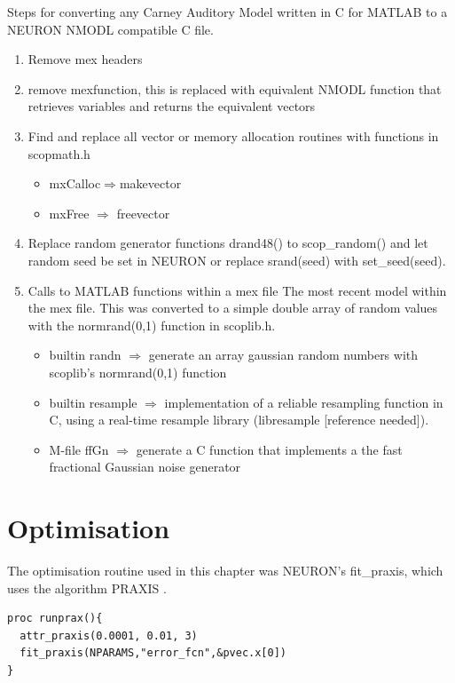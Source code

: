 Steps for converting any Carney Auditory Model written in C for MATLAB to a
NEURON NMODL compatible C file.
\begin{enumerate} 
\item Remove mex headers 
\item remove \textsf{mexfunction}, this is replaced with equivalent NMODL
  function that retrieves variables and returns the equivalent vectors
\item Find and replace all vector or memory allocation routines with functions
  in scopmath.h
\begin{itemize} 
\item \textsf{mxCalloc}$\Rightarrow$\textsf{makevector}
\item \textsf{mxFree} $\Rightarrow$ \textsf{freevector}
\end{itemize} 
\item Replace random generator functions \textsf{drand48()} to
  \mbox{\textsf{scop\_random()}} and let random seed be set in NEURON or replace
  \textsf{srand(seed)} with \mbox{\textsf{set\_seed(seed)}}.
\item Calls to MATLAB functions within a mex file The most recent model within
  the mex file.  This was converted to a simple double array of random values
  with the \mbox{\textsf{normrand(0,1)}} function in \mbox{\textsf{scoplib.h}}.
\begin{itemize}
\item builtin \textsf{randn} $\Rightarrow$ generate an array gaussian random numbers with scoplib's
  \mbox{\textsf{normrand(0,1)}} function
\item builtin \textsf{resample} $\Rightarrow$ implementation of a reliable resampling function in C, using
  a real-time resample library (libresample [reference needed]).
\item M-file \textsf{ffGn} $\Rightarrow$ generate a C function that implements a the fast fractional Gaussian noise generator
\end{itemize}

\end{enumerate}


\section{Optimisation}

The optimisation  routine used in this chapter was NEURON's \textsf{fit\_praxis}, which uses the algorithm PRAXIS \citep{Brent:1976}.

\begin{lstlisting}[label=lbl:runprax,caption=Set optimisation attributes and run fitting procedure.]
proc runprax(){
  attr_praxis(0.0001, 0.01, 3)
  fit_praxis(NPARAMS,"error_fcn",&pvec.x[0])
}
\end{lstlisting}

